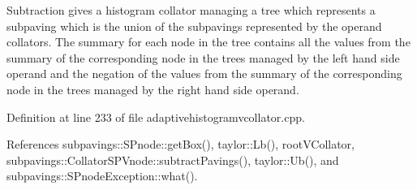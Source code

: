 \-Subtraction gives a histogram collator managing a tree which represents a subpaving which is the union of the subpavings represented by the operand collators. \-The summary for each node in the tree contains all the values from the summary of the corresponding node in the trees managed by the left hand side operand and the negation of the values from the summary of the corresponding node in the trees managed by the right hand side operand. 

\-Definition at line 233 of file adaptivehistogramvcollator.\-cpp.



\-References subpavings\-::\-S\-Pnode\-::get\-Box(), taylor\-::\-Lb(), root\-V\-Collator, subpavings\-::\-Collator\-S\-P\-Vnode\-::subtract\-Pavings(), taylor\-::\-Ub(), and subpavings\-::\-S\-Pnode\-Exception\-::what().


